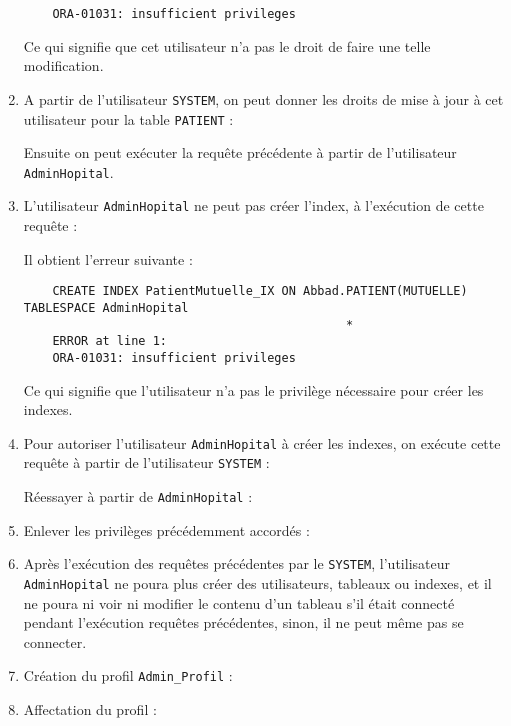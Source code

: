 \documentclass[12pt,a4paper]{article}
\begin{document}
\begin{enumerate}
\begin{verbatim}
	ORA-01031: insufficient privileges
	\end{verbatim}
	Ce qui signifie que cet utilisateur n'a pas le droit de faire une telle modification.
	\item A partir de l'utilisateur \texttt{SYSTEM}, on peut donner les droits de mise à jour à cet utilisateur
	pour la table \texttt{PATIENT} :
	
	Ensuite on peut exécuter la requête précédente à partir de l'utilisateur \texttt{AdminHopital}.
	
	\item L'utilisateur \texttt{AdminHopital} ne peut pas créer l'index, à l'exécution de cette requête :
	
	Il obtient l'erreur suivante :
	\begin{verbatim}
	CREATE INDEX PatientMutuelle_IX ON Abbad.PATIENT(MUTUELLE) TABLESPACE AdminHopital
	                                         *
	ERROR at line 1:
	ORA-01031: insufficient privileges
	\end{verbatim}
	Ce qui signifie que l'utilisateur n'a pas le privilège nécessaire pour créer les indexes.
	\item Pour autoriser l'utilisateur \texttt{AdminHopital} à créer les indexes, on exécute cette requête
	à partir de l'utilisateur \texttt{SYSTEM} :
	
	Réessayer à partir de \texttt{AdminHopital} :
	
	\item Enlever les privilèges précédemment accordés :
	
	\item Après l'exécution des requêtes précédentes par le \texttt{SYSTEM}, l'utilisateur \texttt{AdminHopital}
	ne poura plus créer des utilisateurs, tableaux ou indexes, et il ne poura ni voir ni modifier le contenu
	d'un tableau s'il était connecté pendant l'exécution requêtes précédentes, sinon, il ne peut même pas se connecter.
	\item Création du profil \texttt{Admin\_Profil} :
	
	\item Affectation du profil :
	
\end{enumerate}
\end{document}
